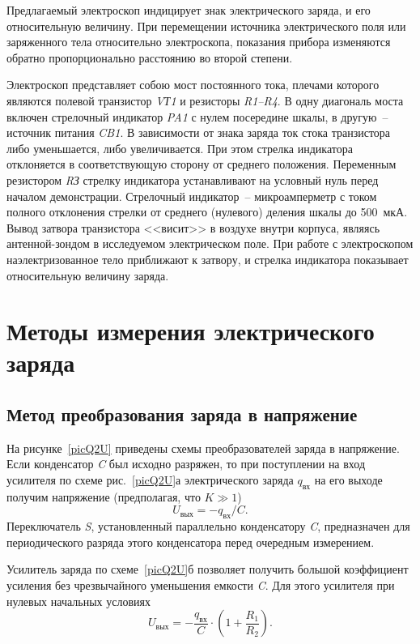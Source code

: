 \documentclass[pscyr,titlepage]{hedreport}
\begin{document}
  Предлагаемый электроскоп индицирует знак электрического заряда, и его
  относительную величину. При перемещении источника электрического поля или
  заряженного тела относительно электроскопа, показания прибора изменяются
  обратно пропорционально расстоянию во второй степени.

  Электроскоп представляет собою мост постоянного тока, плечами которого
  являются полевой транзистор \emph{VТ1} и резисторы \emph{R1--R4}. В одну
  диагональ моста включен стрелочный индикатор \emph{PA1} с нулем посередине
  шкалы, в другую~-- источник питания \emph{CB1}. В зависимости от знака заряда
  ток стока транзистора либо уменьшается, либо увеличивается. При этом стрелка
  индикатора отклоняется в соответствующую сторону от среднего положения.
  Переменным резистором \emph{RЗ} стрелку индикатора устанавливают на условный
  нуль перед началом демонстрации. Стрелочный индикатор~-- микроамперметр с
  током полного отклонения стрелки от среднего (нулевого) деления шкалы до
  500~мкА. Вывод затвора транзистора <<висит>> в воздухе внутри корпуса, являясь
  антенной-зондом в исследуемом электрическом поле. При работе с электроскопом
  наэлектризованное тело приближают к затвору, и стрелка индикатора показывает
  относительную величину заряда.

  \section{Методы измерения электрического заряда}
  \subsection{Метод преобразования заряда в напряжение}

  На рисунке~\ref{picQ2U} приведены схемы преобразователей заряда в напряжение.
  Если конденсатор \emph{C} был исходно разряжен, то при поступлении на вход
  усилителя по схеме рис.~\ref{picQ2U}а электрического заряда \( q_\text{вх} \)
  на его выходе получим напряжение (предполагая, что \( K \gg 1 \))
  \[
    U_\text{вых} = -q_\text{вх} / C.
  \]
  Переключатель \emph{S}, установленный
  параллельно конденсатору \emph{C}, предназначен для периодического разряда
  этого конденсатора перед очередным измерением.
  
  Усилитель заряда по схеме~\ref{picQ2U}б позволяет получить большой коэффициент
  усиления без чрезвычайного уменьшения емкости \emph{C}. Для этого усилителя
  при нулевых начальных условиях
  \[
    U_\text{вых} = -\frac{q_\text{вх}}{C}\cdot
      \left( 1 + \frac{R_1}{R_2} \right).
  \]
\end{document}
